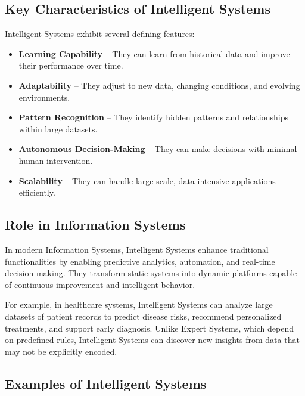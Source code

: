 \documentclass[12pt]{article}
\begin{document}
\subsection{Key Characteristics of Intelligent Systems}

Intelligent Systems exhibit several defining features:

\begin{itemize}
    \item \textbf{Learning Capability} -- They can learn from historical data and improve their performance over time.
    
    \item \textbf{Adaptability} -- They adjust to new data, changing conditions, and evolving environments.
    
    \item \textbf{Pattern Recognition} -- They identify hidden patterns and relationships within large datasets.
    
    \item \textbf{Autonomous Decision-Making} -- They can make decisions with minimal human intervention.
    
    \item \textbf{Scalability} -- They can handle large-scale, data-intensive applications efficiently.
\end{itemize}

\subsection{Role in Information Systems}

In modern Information Systems, Intelligent Systems enhance traditional functionalities by enabling predictive analytics, automation, and real-time decision-making. They transform static systems into dynamic platforms capable of continuous improvement and intelligent behavior.

For example, in healthcare systems, Intelligent Systems can analyze large datasets of patient records to predict disease risks, recommend personalized treatments, and support early diagnosis. Unlike Expert Systems, which depend on predefined rules, Intelligent Systems can discover new insights from data that may not be explicitly encoded.

\subsection{Examples of Intelligent Systems}
\end{document}
